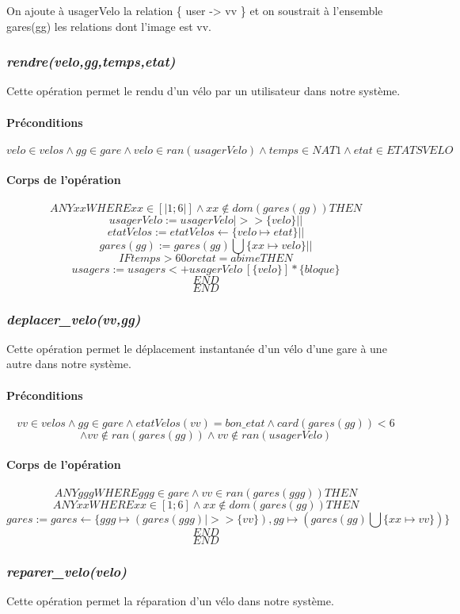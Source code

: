 \documentclass[12pt]{article}
\begin{document}
On ajoute à usagerVelo la relation \{ user -> vv \} et on soustrait à l'ensemble gares(gg) les relations dont l'image est vv.
\subsubsection{\textit{rendre(velo,gg,temps,etat)}}
Cette opération permet le rendu d'un vélo par un utilisateur dans notre système.
\paragraph{Préconditions}
\[ velo \in velos \land gg \in gare \land velo \in ran(usagerVelo) \land temps \in NAT1 \land etat \in ETATSVELO\]
\paragraph{Corps de l'opération}
\[ANY xx WHERE xx \in [|1;6|] \land xx \notin dom(gares(gg)) THEN\]
\[ usagerVelo := usagerVelo |>> \{velo\} || \]
\[ etatVelos := etatVelos \leftarrow \{ velo \mapsto etat \} || \]
\[ gares(gg) := gares(gg) \bigcup \{xx \mapsto velo\} || \]
\[ IF temps > 60 or etat = abime THEN \]
\[ usagers := usagers <+ usagerVelo~[\{velo\}] * \{bloque\} \]
\[ END \]
\[END\]

\subsubsection{\textit{deplacer\_velo(vv,gg)}}
Cette opération permet le déplacement instantanée d'un vélo d'une gare à une autre dans notre système.
\paragraph{Préconditions}
\[ vv \in velos \land gg \in gare \land etatVelos(vv) = bon\_etat \land card(gares(gg))<6 \]
\[\land vv \notin ran(gares(gg)) \land vv \notin ran(usagerVelo)\]
\paragraph{Corps de l'opération}
\[ANY ggg WHERE ggg \in gare \land vv \in ran(gares(ggg)) THEN
\]
\[ ANY xx WHERE xx \in [1;6] \land xx \notin dom(gares(gg)) THEN \]
\[ gares := gares \leftarrow \{ggg \mapsto (gares(ggg) |>> \{vv\}), gg \mapsto (gares(gg) \bigcup \{xx \mapsto vv\})\} \]
\[ END \]
\[END\]

\subsubsection{\textit{reparer\_velo(velo)}}
Cette opération permet la réparation d'un vélo dans notre système.
\end{document}
